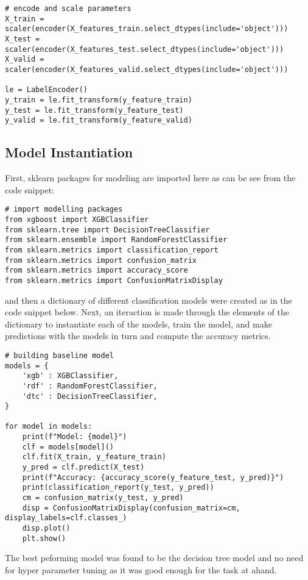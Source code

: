 \begin{verbatim}
# encode and scale parameters
X_train = scaler(encoder(X_features_train.select_dtypes(include='object')))
X_test = scaler(encoder(X_features_test.select_dtypes(include='object')))
X_valid = scaler(encoder(X_features_valid.select_dtypes(include='object')))

le = LabelEncoder()
y_train = le.fit_transform(y_feature_train)
y_test = le.fit_transform(y_feature_test) 
y_valid = le.fit_transform(y_feature_valid)
\end{verbatim}

\subsection{Model Instantiation}
First, sklearn packages for modeling are imported here as can be see from the code snippet:
\begin{verbatim}
# import modelling packages
from xgboost import XGBClassifier
from sklearn.tree import DecisionTreeClassifier
from sklearn.ensemble import RandomForestClassifier
from sklearn.metrics import classification_report
from sklearn.metrics import confusion_matrix
from sklearn.metrics import accuracy_score
from sklearn.metrics import ConfusionMatrixDisplay
\end{verbatim}

and then a dictionary of different classification models were created as in the code snippet below. Next, an iteraction is made through the elements of the dictionary to instantiate each of the models, train the model, and make predictions with the models in turn and compute the accuracy metrics. 

\begin{verbatim}
# building baseline model
models = {
	'xgb' : XGBClassifier,
	'rdf' : RandomForestClassifier,
	'dtc' : DecisionTreeClassifier,
}

for model in models:
	print(f"Model: {model}")
	clf = models[model]()
	clf.fit(X_train, y_feature_train)
	y_pred = clf.predict(X_test)
	print(f"Accuracy: {accuracy_score(y_feature_test, y_pred)}")
	print(classification_report(y_test, y_pred))
	cm = confusion_matrix(y_test, y_pred)
	disp = ConfusionMatrixDisplay(confusion_matrix=cm, display_labels=clf.classes_)
	disp.plot()
	plt.show()
\end{verbatim}

The best peforming model was found to be the decision tree model and no need for hyper parameter tuning as it was good enough for the task at ahand. 

